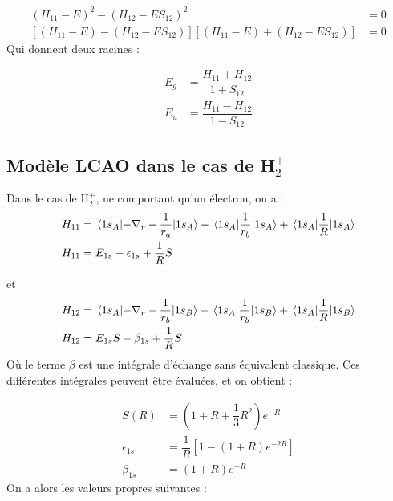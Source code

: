 \begin{align*}
    (H_{11}-E)^2 - (H_{12}-ES_{12})^2 &= 0\\
    [(H_{11}-E) - (H_{12}-ES_{12})][(H_{11}-E) + (H_{12}-ES_{12})] &= 0
\end{align*}
Qui donnent deux racines :

\begin{equation}
    \begin{split}
        E_g &= \dfrac{H_{11}+H_{12}}{1+S_{12}}\\
        E_u &=\dfrac{H_{11}-H_{12}}{1-S_{12}}
    \end{split}
\end{equation}


\subsection{Modèle LCAO dans le cas de H$_2^+$}


Dans le cas de H$_2^+$, ne comportant qu'un électron, on a :
\begin{align*}
    H_{11} &= \mel{1s_A}{-\nabla_r-\dfrac{1}{r_a}}{1s_A} - \mel{1s_A}{\dfrac{1}{r_b}}{1s_A} + \mel{1s_A}{\dfrac{1}{R}}{1s_A}\\
    H_{11} &= E_{1s}-\epsilon_{1s}+\dfrac{1}{R}S
\end{align*}

et
\begin{align*}
    H_{12} &= \mel{1s_A}{-\nabla_r-\dfrac{1}{r_b}}{1s_B} - \mel{1s_A}{\dfrac{1}{r_b}}{1s_B} + \mel{1s_A}{\dfrac{1}{R}}{1s_B}\\
    H_{12} &= E_{1s}S-\beta_{1s} + \dfrac{1}{R}S
\end{align*}
Où le terme $\beta$ est une intégrale d'échange sans équivalent classique. Ces différentes intégrales peuvent être évaluées, et on obtient :

\begin{align*}
    S(R) &= (1+R+\dfrac{1}{3}R^2)e^{-R}\\
    \epsilon_{1s} &= \dfrac{1}{R}[1-(1+R)e^{-2R}]\\
    \beta_{1s} &= (1+R)e^{-R}
\end{align*}
On a alors les valeurs propres suivantes :

